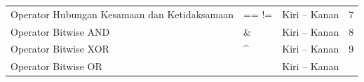 \begin{longtable}[]{@{}llll@{}}
\begin{minipage}[t]{0.52\columnwidth}
Operator Hubungan Kesamaan dan Ketidaksamaan
\strut\end{minipage} &
\begin{minipage}[t]{0.17\columnwidth}\raggedright\strut
== !=
\strut\end{minipage} &
\begin{minipage}[t]{0.14\columnwidth}\raggedright\strut
Kiri -- Kanan
\strut\end{minipage} &
\begin{minipage}[t]{0.05\columnwidth}\raggedright\strut
7
\strut\end{minipage}\tabularnewline
\begin{minipage}[t]{0.52\columnwidth}\raggedright\strut
Operator Bitwise AND
\strut\end{minipage} &
\begin{minipage}[t]{0.17\columnwidth}\raggedright\strut
\&
\strut\end{minipage} &
\begin{minipage}[t]{0.14\columnwidth}\raggedright\strut
Kiri -- Kanan
\strut\end{minipage} &
\begin{minipage}[t]{0.05\columnwidth}\raggedright\strut
8
\strut\end{minipage}\tabularnewline
\begin{minipage}[t]{0.52\columnwidth}\raggedright\strut
Operator Bitwise XOR
\strut\end{minipage} &
\begin{minipage}[t]{0.17\columnwidth}\raggedright\strut
\^{}
\strut\end{minipage} &
\begin{minipage}[t]{0.14\columnwidth}\raggedright\strut
Kiri -- Kanan
\strut\end{minipage} &
\begin{minipage}[t]{0.05\columnwidth}\raggedright\strut
9
\strut\end{minipage}\tabularnewline
\begin{minipage}[t]{0.52\columnwidth}\raggedright\strut
Operator Bitwise OR
\strut\end{minipage} &
\begin{minipage}[t]{0.17\columnwidth}\raggedright\strut
\texttt{\textbar{}}
\strut\end{minipage} &
\begin{minipage}[t]{0.14\columnwidth}\raggedright\strut
Kiri -- Kanan
\strut\end{minipage} &
\begin{minipage}[t]{0.05\columnwidth}\raggedright\strut

\end{minipage}
\end{longtable}
